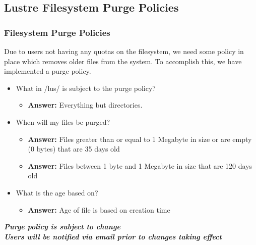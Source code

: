 \subsection{Lustre Filesystem Purge Policies}
\begin{frame}
\frametitle{{\lustre} Filesystem Purge Policies}
Due to users not having any quotas on the {\lustre} filesystem, we need some policy in place which removes older files from the system.  To accomplish this, we have implemented a purge policy.

\begin{itemize}
\item What in \ctilde/lus/ is subject to the purge policy?
   \begin{itemize}
   \item \textbf{Answer:} Everything but directories.
   \end{itemize}
\item When will my files be purged?
  \begin{itemize}  
    \item \textbf{Answer:} Files greater than or equal to 1 Megabyte in size or are empty (0 bytes) that are 35 days old
    \item \textbf{Answer:} Files between 1 byte and 1 Megabyte in size that are 120 days old
  \end{itemize}
\item What is the age based on?
   \begin{itemize}
   \item \textbf{Answer:} Age of file is based on creation time
   \end{itemize}
   
\end{itemize}
\btVFill
\begin{center}
\footnotesize \textbf{\emph{Purge policy is subject to change~\\Users will be notified via email prior to changes taking effect}}
\end{center}
\end{frame}



